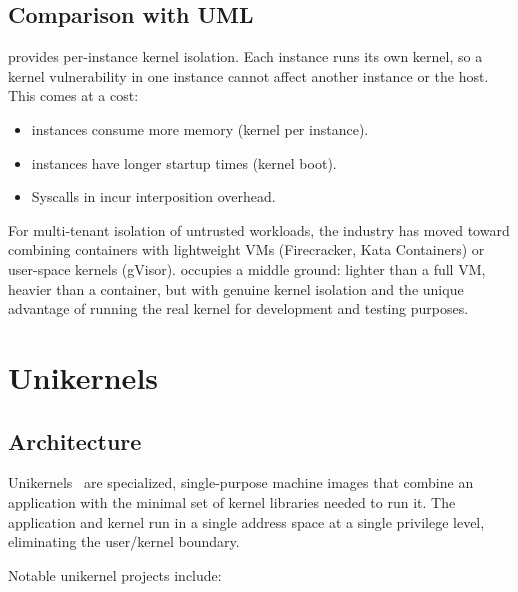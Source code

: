 \subsection{Comparison with UML}

\UML{} provides per-instance kernel isolation.  Each \UML{} instance
runs its own kernel, so a kernel vulnerability in one instance cannot
affect another instance or the host.  This comes at a cost:

\begin{itemize}[leftmargin=2em]
  \item \UML{} instances consume more memory (kernel per instance).
  \item \UML{} instances have longer startup times (kernel boot).
  \item Syscalls in \UML{} incur interposition overhead.
\end{itemize}

For multi-tenant isolation of untrusted workloads, the industry
has moved toward combining containers with lightweight VMs
(Firecracker, Kata Containers) or user-space kernels (gVisor).
\UML{} occupies a middle ground: lighter than a full VM, heavier
than a container, but with genuine kernel isolation and the unique
advantage of running the real kernel for development and testing
purposes.


\section{Unikernels}
\label{sec:related-unikernels}

\subsection{Architecture}

Unikernels~\cite{madhavapeddy2013,kuenzer2021} are specialized,
single-purpose machine images that combine an application with the
minimal set of kernel libraries needed to run it.  The application
and kernel run in a single address space at a single privilege level,
eliminating the user/kernel boundary.

Notable unikernel projects include:

